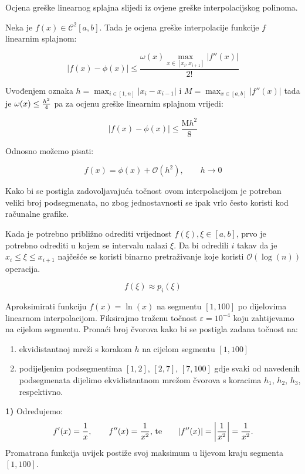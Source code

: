 Ocjena greške linearnog splajna slijedi iz ovjene greške interpolacijskog polinoma.

Neka je $f(x)\in\mathcal{C}^2[a,b]$. Tada je ocjena greške interpolacije funkcije $f$ linearnim splajnom:

$$
|f(x)-\phi(x)| \leq \frac{\omega(x)\max_{x\in[x_i,x_{i+1}]}|f''(x)|}{2!}
$$

Uvođenjem oznaka $h=\max_{i\in[1,n]}|x_i-x_{i-1}|$ i $M=\max_{x\in[a,b]}|f''(x)|$ tada je $\omega(x)\leq{h^2\over4}$ pa za ocjenu greške linearnim splajnom vrijedi:

$$
|f(x) - \phi(x)|\leq \frac{\text{M}h^2}{8}
$$

Odnosno možemo pisati:

\begin{equation*}
    f(x) = \phi(x) + \mathcal{O}(h^2),\qquad h\to0
\end{equation*}

Kako bi se postigla zadovoljavajuća točnost ovom interpolacijom je potreban veliki broj podsegmenata, no zbog jednostavnosti se ipak vrlo često koristi kod računalne grafike.

Kada je potrebno približno odrediti vrijednost $f(\xi), \xi\in[a,b]$, prvo je potrebno odrediti u kojem se intervalu nalazi $\xi$. Da bi odredili $i$ takav da je $x_i\leq\xi\leq x_{i+1}$ najčešće se koristi binarno pretraživanje koje koristi $\mathcal{O}(\log(n))$ operacija.

$$
f(\xi)\approx p_i(\xi)
$$

\newpage

\begin{example}
    Aproksimirati funkciju $f(x) = \ln(x)$ na segmentu $[1,100]$ po dijelovima linearnom interpolacijom. Fiksirajmo traženu točnost $\varepsilon = 10^{-4}$ koju zahtijevamo na cijelom segmentu. Pronaći broj čvorova kako bi se postigla zadana točnost na:

    \begin{enumerate}
        \item ekvidistantnoj mreži s korakom $h$ na cijelom segmentu $[1,100]$
        \item podijeljenim podsegmentima $[1,2]$, $[2,7]$, $[7,100]$ gdje svaki od navedenih podsegmenata dijelimo ekvidistantnom mrežom čvorova s koracima $h_1$, $h_2$, $h_3$, respektivno.
    \end{enumerate}
\end{example}

\textbf{1)} Određujemo:
    $$
    f'(x) = {1\over x},\qquad f''(x)={1\over x^2}\text{, te}\qquad |f''(x)|=\left|{1\over x^2}\right|={1\over x^2}.
    $$
    Promatrana funkcija uvijek postiže svoj maksimum u lijevom kraju segmenta $[1,100]$.

